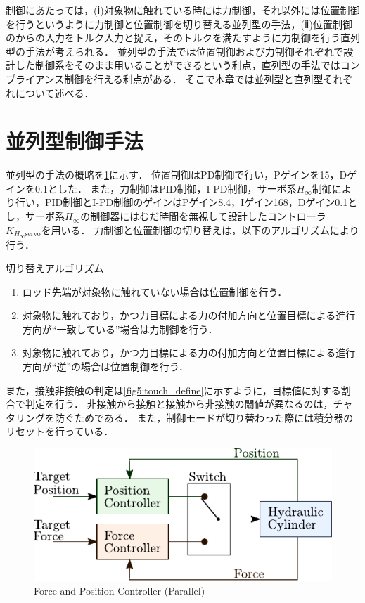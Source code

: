 制御にあたっては，(ⅰ)対象物に触れている時には力制御，それ以外には位置制御を行うというように力制御と位置制御を切り替える並列型の手法，(ⅱ)位置制御のからの入力をトルク入力と捉え，そのトルクを満たすように力制御を行う直列型の手法が考えられる．
並列型の手法では位置制御および力制御それぞれで設計した制御系をそのまま用いることができるという利点，直列型の手法ではコンプライアンス制御を行える利点がある．
そこで本章では並列型と直列型それぞれについて述べる．

\section{並列型制御手法}
\label{sec:並列型制御手法}
並列型の手法の概略を\figname\ref{fig5:pararell_torqueandposition}に示す．
位置制御はPD制御で行い，Pゲインを15，Dゲインを0.1とした．
また，力制御はPID制御，I-PD制御，サーボ系$H_\infty$制御により行い，PID制御とI-PD制御のゲインはPゲイン8.4，Iゲイン168，Dゲイン0.1とし，サーボ系$H_\infty$の制御器にはむだ時間を無視して設計したコントローラ$K_{H_\infty\mathrm{servo}}$を用いる．
力制御と位置制御の切り替えは，以下のアルゴリズムにより行う．
\begin{itembox}[l]{切り替えアルゴリズム}
    \begin{enumerate}
        \item ロッド先端が対象物に触れていない場合は位置制御を行う．
        \item 対象物に触れており，かつ力目標による力の付加方向と位置目標による進行方向が``一致している''場合は力制御を行う．
        \item 対象物に触れており，かつ力目標による力の付加方向と位置目標による進行方向が``逆''の場合は位置制御を行う．
    \end{enumerate}
\end{itembox}

また，接触非接触の判定は\figname\ref{fig5:touch_define}に示すように，目標値に対する割合で判定を行う．
非接触から接触と接触から非接触の閾値が異なるのは，チャタリングを防ぐためである．
また，制御モードが切り替わった際には積分器のリセットを行っている．

\begin{figure}[t]
    \centering
        \includegraphics[keepaspectratio, scale=1.0]{contents/IntegrationControl/figure/pararell_torqueandposition.pdf}
        \caption{Force and Position Controller (Parallel)}
        \label{fig5:pararell_torqueandposition}
\end{figure}

